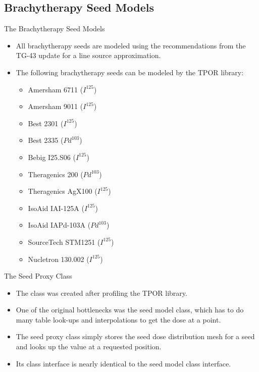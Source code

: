 \documentclass{beamer}
\begin{document}
\subsection{Brachytherapy Seed Models}
\begin{frame}{The Brachytherapy Seed Models}

  \begin{itemize}
    \item All brachytherapy seeds are modeled using the recommendations from
      the TG-43 update for a line source approximation.
      \medskip
    \item The following brachytherapy seeds can be modeled by the TPOR library:
      \begin{itemize}
        \item Amersham 6711 ($I^{125}$)
        \item Amersham 9011 ($I^{125}$)
        \item Best 2301 ($I^{125}$)
        \item Best 2335 ($Pd^{103}$)
        \item Bebig I25.S06 ($I^{125}$)
        \item Theragenics 200 ($Pd^{103}$)
        \item Theragenics AgX100 ($I^{125}$)
        \item IsoAid IAI-125A ($I^{125}$)
        \item IsoAid IAPd-103A ($Pd^{103}$)
        \item SourceTech STM1251 ($I^{125}$)
        \item Nucletron 130.002 ($I^{125}$)
      \end{itemize}
  \end{itemize}
  
\end{frame}

\begin{frame}{The Seed Proxy Class}

  \begin{itemize}
    \item The class was created after profiling the TPOR library. 
      \medskip
    \item One of the original bottlenecks was the seed model class, which
      has to do many table look-ups and interpolations to get the dose at a 
      point.
      \medskip
    \item The seed proxy class simply stores the seed dose distribution mesh
      for a seed and looks up the value at a requested position. 
      \medskip
    \item Its class interface is nearly identical to the seed model class
      interface.
  \end{itemize}

\end{frame}
\end{document}
